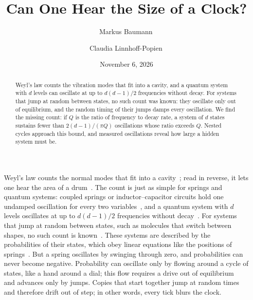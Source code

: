 \documentclass[aps,prl,twocolumn,superscriptaddress,amsmath,amssymb,floatfix,longbibliography]{revtex4-2}
\begin{document}
\title{Can One Hear the Size of a Clock?}

\author{Markus Baumann\,}
\author{Claudia Linnhoff-Popien\,}

\date{November 6, 2026}

\begin{abstract}
 Weyl's law counts the vibration modes that fit into a cavity, and a quantum system with $d$ levels can oscillate at up to $d(d-1)/2$ frequencies without decay. For systems that jump at random between states, no such count was known: they oscillate only out of equilibrium, and the random timing of their jumps damps every oscillation. We find the missing count: if $Q$ is the ratio of frequency to decay rate, a system of $d$ states sustains fewer than $2(d-1)/(\pi Q)$ oscillations whose ratio exceeds $Q$. Nested cycles approach this bound, and measured oscillations reveal how large a hidden system must be.
\end{abstract}

\maketitle

Weyl's law counts the normal modes that fit into a cavity~\cite{weyl1912}; read in reverse, it lets one hear the area of a drum~\cite{kac1966}. The count is just as simple for springs and quantum systems: coupled springs or inductor--capacitor circuits hold one undamped oscillation for every two variables~\cite{goldstein2002,williamson1936}, and a quantum system with $d$ levels oscillates at up to $d(d-1)/2$ frequencies without decay~\cite{cohentannoudji1977}. For systems that jump at random between states, such as molecules that switch between shapes, no such count is known~\cite{dmitriev1946,karpelevich1951,barato2017}. These systems are described by the probabilities of their states, which obey linear equations like the positions of springs~\cite{schnakenberg1976}. But a spring oscillates by swinging through zero, and probabilities can never become negative. Probability can oscillate only by flowing around a cycle of states, like a hand around a dial; this flow requires a drive out of equilibrium~\cite{qian2000} and advances only by jumps. Copies that start together jump at random times and therefore drift out of step; in other words, every tick blurs the clock.
\end{document}
